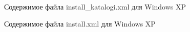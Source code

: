 \begin{figure}[h!]
\caption{Содержимое файла install\_katalogi.xml для Windows XP}
\label{kucher_16:kucher_16}
\end{figure}

\begin{figure}[h!]
\caption{Содержимое файла install.xml для Windows XP}
\label{kucher_17:kucher_17}
\end{figure}

\clearpage


